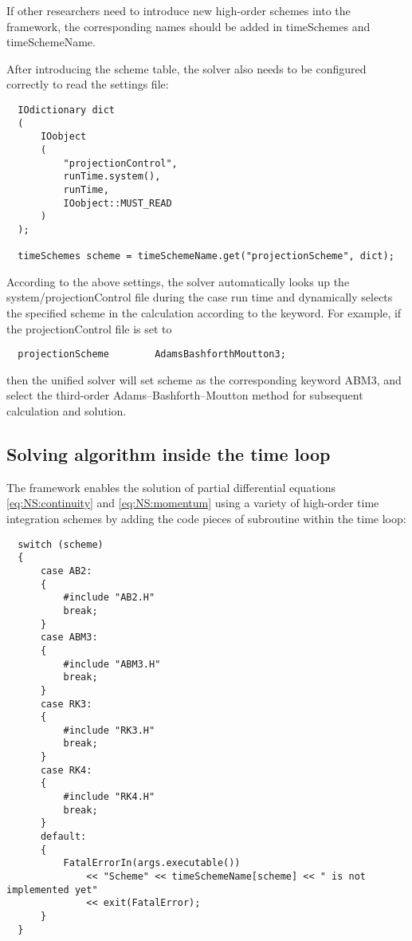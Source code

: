 \documentclass{article}
\begin{document}
If other researchers need to introduce new high-order schemes into the framework, the corresponding names should be added in timeSchemes and timeSchemeName.

After introducing the scheme table, the solver also needs to be configured correctly to read the settings file:

\begin{lstlisting}
  IOdictionary dict
  (
      IOobject
      (
          "projectionControl",
          runTime.system(),
          runTime,
          IOobject::MUST_READ
      )
  );

  timeSchemes scheme = timeSchemeName.get("projectionScheme", dict);
\end{lstlisting}

According to the above settings, the solver automatically looks up the system/projectionControl file during the case run time and dynamically selects the specified scheme in the calculation according to the keyword. For example, if the projectionControl file is set to

\begin{lstlisting}
  projectionScheme        AdamsBashforthMoutton3;
\end{lstlisting}

then the unified solver will set scheme as the corresponding keyword ABM3, and select the third-order Adams--Bashforth--Moutton method for subsequent calculation and solution.


\subsection{Solving algorithm inside the time loop}

The framework enables the solution of partial differential equations \eqref{eq:NS:continuity} and \eqref{eq:NS:momentum} using a variety of high-order time integration schemes by adding the code pieces of subroutine within the time loop:

\begin{lstlisting}
  switch (scheme)
  {
      case AB2:
      {
          #include "AB2.H"
          break;
      }
      case ABM3:
      {
          #include "ABM3.H"
          break;
      }
      case RK3:
      {
          #include "RK3.H"
          break;
      }
      case RK4:
      {
          #include "RK4.H"
          break;
      }
      default:
      {
          FatalErrorIn(args.executable())
              << "Scheme" << timeSchemeName[scheme] << " is not implemented yet"
              << exit(FatalError);
      }
  }
\end{lstlisting}
\end{document}
